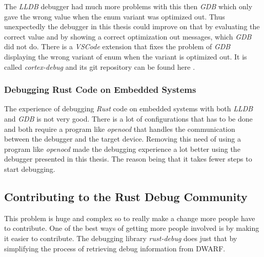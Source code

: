 The \emph{LLDB} debugger had much more problems with this then \emph{GDB} which only gave the wrong value when the enum variant was optimized out.
Thus unexpectedly the debugger in this thesis could improve on that by evaluating the correct value and by showing a correct optimization out messages, which \emph{GDB} did not do.
There is a \emph{VSCode} extension that fixes the problem of \emph{GDB} displaying the wrong variant of enum when the variant is optimized out.
It is called \emph{cortex-debug} and its git repository can be found here \cite{cortex-debug}.


\subsubsection{Debugging Rust Code on Embedded Systems}
The experience of debugging \emph{Rust} code on embedded systems with both \emph{LLDB} and \emph{GDB} is not very good.
There is a lot of configurations that has to be done and both require a program like \emph{openocd} that handles the communication between the debugger and the target device.
Removing this need of using a program like \emph{openocd} made the debugging experience a lot better using the debugger presented in this thesis.
The reason being that it takes fewer steps to start debugging.


\subsection{Contributing to the Rust Debug Community}
This problem is huge and complex so to really make a change more people have to contribute.
One of the best ways of getting more people involved is by making it easier to contribute.
The debugging library \emph{rust-debug} does just that by simplifying the process of retrieving debug information from \gls{DWARF}.

